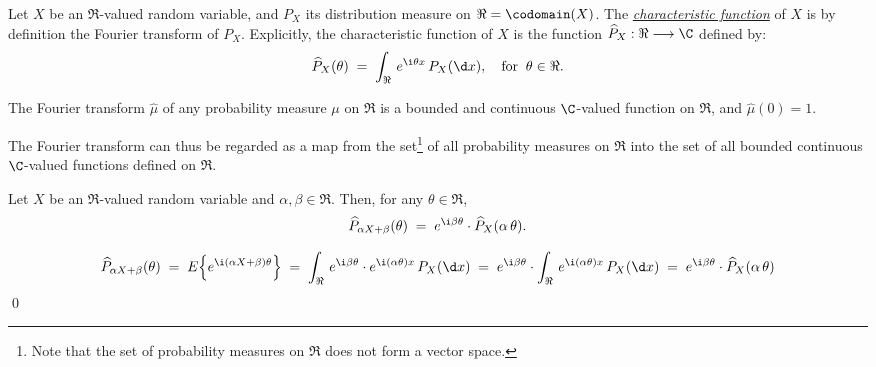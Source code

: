\documentclass{article}
\begin{document}
\begin{definition} \mbox{} \vskip 0.1cm \noindent
Let $X$ be an $\Re$-valued random variable, and $P_{X}$ its distribution measure on $\Re = \codomain(X)$.  The \underline{\emph{characteristic function}} of $X$ is by definition the Fourier transform of $P_{X}$.  Explicitly, the characteristic function of $X$ is the function $\widehat{P}_{X} : \Re \longrightarrow \C$ defined by:
\begin{equation*}
\widehat{P}_{X}(\theta) \; = \; \int_{\Re} \, e^{\i\theta x} \, P_{X}(\d x),
\quad\textnormal{for}\;\; \theta \in \Re.
\end{equation*}
\end{definition}

\begin{theorem} \mbox{} \vskip 0.1cm \noindent
The Fourier transform $\widehat{\mu}$ of any probability measure $\mu$ on $\Re$ is a bounded and continuous $\C$-valued function on $\Re$, and $\widehat{\mu}(0) = 1$.
\end{theorem}

\begin{remark} \mbox{} \vskip 0.1cm \noindent
The Fourier transform can thus be regarded as a map from the set\footnote{Note that the set of probability measures on $\Re$ does not form a vector space.} of all probability measures on $\Re$ into the set of all bounded continuous $\C$-valued functions defined on $\Re$.
\end{remark}

\begin{theorem}\label{ChangeOfVariables} \mbox{} \vskip 0.1cm \noindent
Let $X$ be an $\Re$-valued random variable and $\alpha, \beta \in \Re$.  Then, for any $\theta \in \Re$,
\begin{equation*}
\widehat{P}_{\alpha X + \beta}(\theta) \; = \;
e^{\i\beta\theta}\cdot\widehat{P}_{X}(\alpha\,\theta).
\end{equation*}
\end{theorem}
\proof
\begin{equation*}
        \widehat{P}_{\alpha X + \beta}(\theta)
\;=\;  E\!\left\{e^{\i(\alpha X + \beta)\theta}\right\}
\;=\;  \int_{\Re}\, e^{\i\beta\theta} \cdot e^{\i(\alpha\theta)x}\,P_{X}(\d x)
\;=\;  e^{\i\beta\theta} \cdot \int_{\Re}\, e^{\i(\alpha\theta)x}\,P_{X}(\d x)
\;=\;  e^{\i\beta\theta}\cdot\widehat{P}_{X}(\alpha\,\theta)
\end{equation*}
\qed
\end{document}
